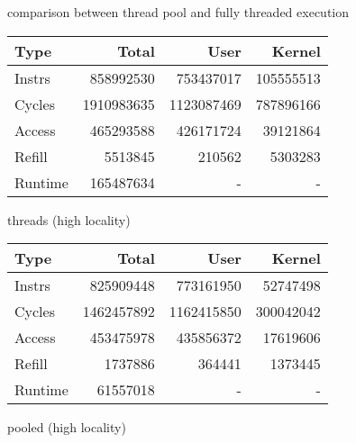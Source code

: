 \documentclass[11pt]{article}
\begin{document}
\begin{figure*}[!h]
	\caption{comparison between thread pool and fully threaded execution}
	\centering
	\begin{subtable}{.48\textwidth}
		\centering
		\begin{tabular}{ l|rrr }
			Type    & Total      & User       & Kernel    \\
			\hline
			Instrs & 858992530 & 753437017 & 105555513 \\ 
			Cycles & 1910983635 & 1123087469 & 787896166 \\ 
			Access & 465293588 & 426171724 & 39121864 \\ 
			Refill & 5513845 & 210562 & 5303283 \\ 
			Runtime & 165487634 & - & - \\ 
			\hline
		\end{tabular}
		\caption{threads (high locality)}
	\end{subtable}
	\hfill
	\begin{subtable}{.48\textwidth} 
		\centering
		\begin{tabular}{ l|rrr }
			Type    & Total      & User       & Kernel    \\
			\hline
			Instrs & 825909448 & 773161950 & 52747498 \\ 
			Cycles & 1462457892 & 1162415850 & 300042042 \\ 
			Access & 453475978 & 435856372 & 17619606 \\ 
			Refill & 1737886 & 364441 & 1373445 \\ 
			Runtime & 61557018 & - & - \\
			\hline
		\end{tabular}
		\caption{pooled (high locality)}        
	\end{subtable}
\end{figure*}
\end{document}
